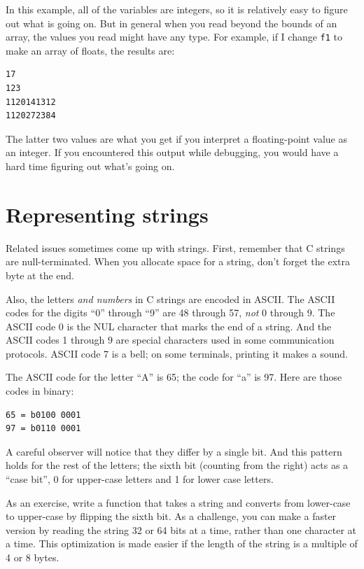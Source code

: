 \documentclass[12pt]{book}
\begin{document}
{In this example, all of the variables are integers, so it is
relatively easy to figure out what is going on.  But in general
when you read beyond the bounds of an array, the values you
read might have any type.  For example, if I change {\tt f1}
to make an array of floats, the results are:

\begin{verbatim}
17
123
1120141312
1120272384
\end{verbatim}

The latter two values are what you get if you interpret a
floating-point value as an integer.  If you encountered this output
while debugging, you would have a hard time figuring out what's
going on.


\section{Representing strings}

Related issues sometimes come up with strings.  First, remember
that C strings are null-terminated.  When you allocate space
for a string, don't forget the extra byte at the end.

Also, the letters {\it and numbers} in C strings are
encoded in ASCII.  The ASCII codes for the digits ``0'' through ``9''
are 48 through 57, {\it not} 0 through 9.  The ASCII code 0 is the NUL
character that marks the end of a string.  And the ASCII codes 1
through 9 are special characters used in some communication protocols.
ASCII code 7 is a bell; on some terminals, printing it makes a sound.

The ASCII code for the letter ``A'' is 65; the code for
``a'' is 97.  Here are those codes in binary:

\begin{verbatim}
65 = b0100 0001
97 = b0110 0001
\end{verbatim}

A careful observer will notice that they differ by a single
bit.  And this pattern holds for the rest of the letters; the
sixth bit (counting from the right) acts as a ``case bit'', 0 for
upper-case letters and 1 for lower case letters.

As an exercise, write a function that takes a string and converts
from lower-case to upper-case by flipping the sixth bit.  As a challenge,
you can make a faster version by reading the string 32 or 64 bits
at a time, rather than one character at a time.  This optimization
is made easier if the length of the string is a multiple of 4 or
8 bytes.

}
\end{document}
